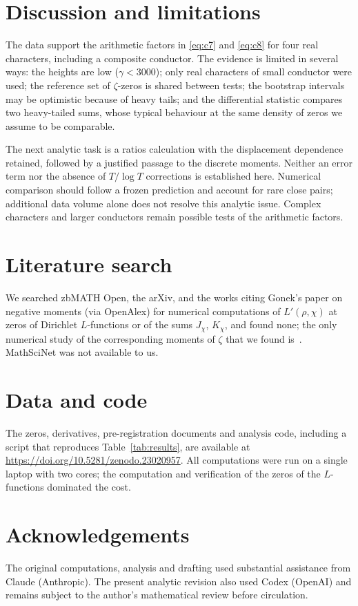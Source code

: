 \documentclass[11pt]{amsart}
\newcommand{\Lp}{L'}
\begin{document}
\section{Discussion and limitations}

The data support the arithmetic factors in \eqref{eq:c7} and \eqref{eq:c8} for four real characters, including a
composite conductor. The evidence is limited in several ways: the heights are low ($\gamma<3000$); only real characters
of small conductor were used; the reference set of $\zeta$-zeros is shared between tests; the bootstrap intervals may
be optimistic because of heavy tails; and the differential statistic compares two heavy-tailed sums, whose typical
behaviour at the same density of zeros we assume to be comparable.

The next analytic task is a ratios calculation with the displacement dependence retained, followed by a justified
passage to the discrete moments. Neither an error term nor the absence of $T/\log T$ corrections is established
here. Numerical comparison should follow a frozen prediction and account for rare close pairs; additional data
volume alone does not resolve this analytic issue. Complex characters and larger conductors remain possible tests
of the arithmetic factors.

\section{Literature search}\label{sec:search}
We searched zbMATH Open, the arXiv, and the works citing Gonek's paper on negative moments (via OpenAlex) for numerical
computations of $\Lp(\rho,\chi)$ at zeros of Dirichlet $L$-functions or of the sums $J_\chi$, $K_\chi$, and found none;
the only numerical study of the corresponding moments of $\zeta$ that we found is~\cite{HO}. MathSciNet was not
available to us. %

\section*{Data and code}
The zeros, derivatives, pre-registration documents and analysis code, including a script that reproduces
Table~\ref{tab:results}, are available at \url{https://doi.org/10.5281/zenodo.23020957}.
All computations were run on a single laptop with two cores; the computation and verification of the zeros of the
$L$-functions dominated the cost.

\section*{Acknowledgements}
The original computations, analysis and drafting used substantial assistance from Claude (Anthropic). The present
analytic revision also used Codex (OpenAI) and remains subject to the author's mathematical review before circulation.
\end{document}
